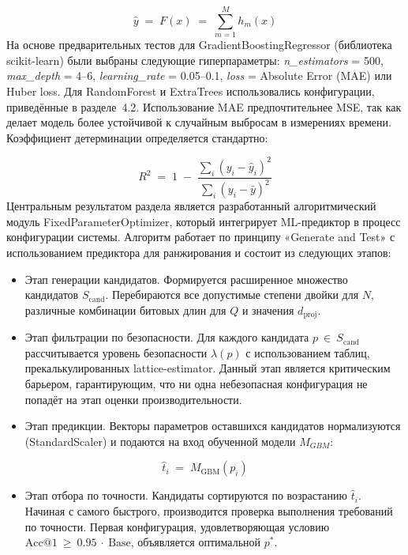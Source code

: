 \documentclass[a4paper, 12pt, oneside, openany]{article}
\begin{document}
\begin{equation}
	\widehat{y} \;=\; F(x) \;=\; \sum_{m = 1}^{M} h_{m}(x)
	\label{eq:3-8}
\end{equation}
На основе предварительных тестов для GradientBoostingRegressor (библиотека scikit-learn) были выбраны следующие гиперпараметры: \emph{n\_estimators} = 500, \emph{max\_depth} = 4--6, \emph{learning\_rate} = 0.05--0.1, \emph{loss} = Absolute Error (MAE) или Huber loss. Для RandomForest и ExtraTrees использовались конфигурации, приведённые в разделе~4.2. Использование MAE предпочтительнее MSE, так как делает модель более устойчивой к случайным выбросам в измерениях времени. Коэффициент детерминации определяется стандартно:

\begin{equation}
	R^{2} \;=\; 1 \;-\; \frac{\sum_{i} \left( y_{i} - \widehat{y}_{i} \right)^{2}}{\sum_{i} \left( y_{i} - \bar{y} \right)^{2}}
	\label{eq:3-9}
\end{equation}
Центральным результатом раздела является разработанный алгоритмический модуль FixedParameterOptimizer, который интегрирует ML-предиктор в процесс конфигурации системы. Алгоритм работает по принципу «Generate and Test» с использованием предиктора для ранжирования и состоит из следующих этапов:

\begin{itemize}
	\item
	Этап генерации кандидатов. Формируется расширенное множество кандидатов \(S_{\mathrm{cand}}\). Перебираются все допустимые степени двойки для \(N\), различные комбинации битовых длин для \(Q\) и значения \(d_{\mathrm{proj}}\).
	\item
	Этап фильтрации по безопасности. Для каждого кандидата \(p\  \in \ S_{\mathrm{cand}}\) рассчитывается уровень безопасности \(\lambda(p)\) с использованием таблиц, прекалькулированных lattice-estimator. Данный этап является критическим барьером, гарантирующим, что ни одна небезопасная конфигурация не попадёт на этап оценки производительности.
	\item
	Этап предикции. Векторы параметров оставшихся кандидатов нормализуются (StandardScaler) и подаются на вход обученной модели \(M_{GBM}\):
\end{itemize}

\begin{equation}
	\widehat{t}_{i} \;=\; M_{\mathrm{GBM}}(p_{i})
	\label{eq:3-10}
\end{equation}

\begin{itemize}
	\item
	Этап отбора по точности. Кандидаты сортируются по возрастанию \({\widehat{t}}_{i}\). Начиная с самого быстрого, производится проверка выполнения требований по точности. Первая конфигурация, удовлетворяющая условию \(\text{Acc}@1\  \geq \ 0.95\  \cdot \ \text{Base}\), объявляется оптимальной \(p^{*}\).
\end{itemize}
\end{document}
